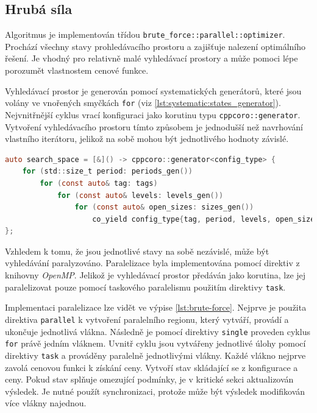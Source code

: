 
\subsection{Hrubá síla}
Algoritmus je implementován třídou \texttt{brute\_force::parallel::optimizer}.
Prochází všechny stavy prohledávacího prostoru a zajišťuje nalezení optimálního řešení.
Je vhodný pro relativně malé vyhledávací prostory a může pomoci lépe porozumět vlastnostem cenové funkce.

Vyhledávací prostor je generován pomocí systematických generátorů, které jsou volány ve vnořených smyčkách \texttt{for} (viz \ref{lst:systematic:states_generator}).
Nejvnitřnější cyklus vrací konfiguraci jako korutinu typu \texttt{cppcoro::generator}.
Vytvoření vyhledávacího prostoru tímto způsobem je jednodušší než navrhování vlastního iterátoru, jelikož na sobě mohou být jednotlivého hodnoty závislé.

\begin{lstlisting}[caption={~Ukázka generování systematického stavového prostoru},label={lst:systematic:states_generator},captionpos=t,abovecaptionskip=-\medskipamount,belowcaptionskip=\medskipamount,language=C]
auto search_space = [&]() -> cppcoro::generator<config_type> {
    for (std::size_t period: periods_gen())
        for (const auto& tag: tags)
            for (const auto& levels: levels_gen())
                for (const auto& open_sizes: sizes_gen())
                    co_yield config_type{tag, period, levels, open_sizes};
};
\end{lstlisting}

Vzhledem k tomu, že jsou jednotlivé stavy na sobě nezávislé, může být vyhledávání paralyzováno.
Paralelizace byla implementována pomocí direktiv z knihovny \textit{OpenMP}.
Jelikož je vyhledávací prostor předáván jako korutina, lze jej paralelizovat pouze pomocí taskového paralelismu použitím direktivy \texttt{task}.

Implementaci paralelizace lze vidět ve výpise \ref{lst:brute-force}.
Nejprve je použita direktiva \texttt{parallel} k vytvoření paralelního regionu, který vytváří, provádí a ukončuje jednotlivá vlákna.
Následně je pomocí direktivy \texttt{single} proveden cyklus \texttt{for} právě jedním vláknem.
Uvnitř cyklu jsou vytvářeny jednotlivé úlohy pomocí direktivy \texttt{task} a prováděny paralelně jednotlivými vlákny.
Každé vlákno nejprve zavolá cenovou funkci k získání ceny.
Vytvoří stav skládající se z konfigurace a ceny.
Pokud stav splňuje omezující podmínky, je v kritické sekci aktualizován výsledek.
Je nutné použít synchronizaci, protože může být výsledek modifikován více vlákny najednou.

